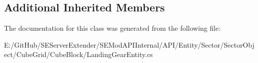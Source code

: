 \subsection*{Additional Inherited Members}


The documentation for this class was generated from the following file\+:\begin{DoxyCompactItemize}
\item 
E\+:/\+Git\+Hub/\+S\+E\+Server\+Extender/\+S\+E\+Mod\+A\+P\+I\+Internal/\+A\+P\+I/\+Entity/\+Sector/\+Sector\+Object/\+Cube\+Grid/\+Cube\+Block/Landing\+Gear\+Entity.\+cs\end{DoxyCompactItemize}
